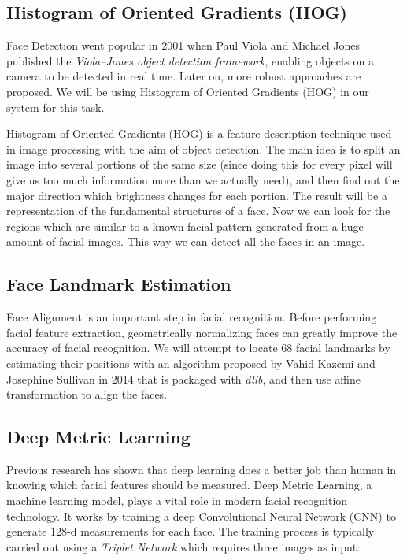 \subsection{Histogram of Oriented Gradients (HOG)}
Face Detection went popular in 2001 when Paul Viola and Michael Jones published the \emph{Viola–Jones object detection framework},
enabling objects on a camera to be detected in real time. Later on, more robust approaches are proposed. We will be using
Histogram of Oriented Gradients (HOG) in our system for this task.

Histogram of Oriented Gradients (HOG) is a feature description technique used in image processing with the aim of object
detection. The main idea is to split an image into several portions of the same size (since doing this for every pixel will give
us too much information more than we actually need), and then find out the major direction which brightness changes for each portion.
The result will be a representation of the fundamental structures of a face. Now we can look for the regions which are
similar to a known facial pattern generated from a huge amount of facial images. This way we can detect all the faces
in an image.


\subsection{Face Landmark Estimation}
Face Alignment is an important step in facial recognition. Before performing facial feature extraction, geometrically
normalizing faces can greatly improve the accuracy of facial recognition. We will attempt to locate 68 facial landmarks
by estimating their positions with an algorithm proposed by Vahid Kazemi and Josephine Sullivan in 2014 that is packaged
with \emph{dlib}, and then use affine transformation to align the faces.


\subsection{Deep Metric Learning}
Previous research has shown that deep learning does a better job than human in knowing which facial features should
be measured. Deep Metric Learning, a machine learning model, plays a vital role in modern facial recognition technology.
It works by training a deep Convolutional Neural Network (CNN) to generate 128-d measurements for each face. The training
process is typically carried out using a \emph{Triplet Network} which requires three images as input:

